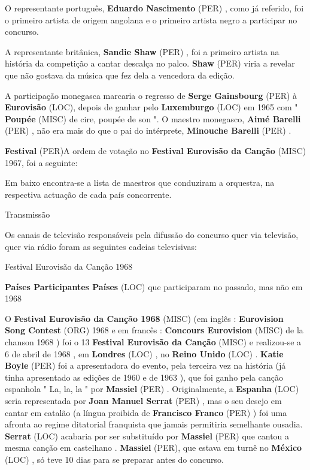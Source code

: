 \documentclass[12pt,a4paper]{article}
\begin{document}
O representante português, \textbf{Eduardo Nascimento} (PER) , como já referido, foi o primeiro artista de origem angolana e o primeiro artista negro a participar no concurso.

A representante britânica, \textbf{Sandie Shaw} (PER) , foi a primeiro artista na história da competição a cantar descalça no palco. \textbf{Shaw} (PER) viria a revelar que não gostava da música que fez dela a vencedora da edição.

A participação monegasca marcaria o regresso de \textbf{Serge Gainsbourg} (PER) à \textbf{Eurovisão} (LOC), depois de ganhar pelo \textbf{Luxemburgo} (LOC) em 1965 com " \textbf{Poupée} (MISC) de cire, poupée de son ". O maestro monegasco, \textbf{Aimé Barelli} (PER) , não era mais do que o pai do intérprete, \textbf{Minouche Barelli} (PER) .



\textbf{Festival} (PER)A ordem de votação no \textbf{Festival Eurovisão da Canção} (MISC) 1967, foi a seguinte:

Em baixo encontra-se a lista de maestros que conduziram a orquestra, na respectiva actuação de cada país concorrente.



Transmissão

Os canais de televisão responsáveis pela difussão do concurso quer via televisão, quer via rádio foram as seguintes cadeias televisivas:



Festival Eurovisão da Canção 1968



\textbf{Países Participantes Países} (LOC) que participaram no passado, mas não em 1968

O \textbf{Festival Eurovisão da Canção 1968} (MISC) (em inglês : \textbf{Eurovision Song Contest} (ORG) 1968 e em francês : \textbf{Concours Eurovision} (MISC) de la chanson 1968 ) foi o 13 \textbf{Festival Eurovisão da Canção} (MISC) e realizou-se a 6 de abril de 1968 , em \textbf{Londres} (LOC) , no \textbf{Reino Unido} (LOC) . \textbf{Katie Boyle} (PER) foi a apresentadora do evento, pela terceira vez na história (já tinha apresentado as edições de 1960 e de 1963 ), que foi ganho pela canção espanhola " La, la, la " por \textbf{Massiel} (PER) . Originalmente, a \textbf{Espanha} (LOC) seria representada por \textbf{Joan Manuel Serrat} (PER) , mas o seu desejo em cantar em catalão (a língua proibida de \textbf{Francisco Franco} (PER) ) foi uma afronta ao regime ditatorial franquista que jamais permitiria semelhante ousadia. \textbf{Serrat} (LOC) acabaria por ser substituído por \textbf{Massiel} (PER) que cantou a mesma canção em castelhano . \textbf{Massiel} (PER), que estava em turnê no \textbf{México} (LOC) , só teve 10 dias para se preparar antes do concurso.
\end{document}
